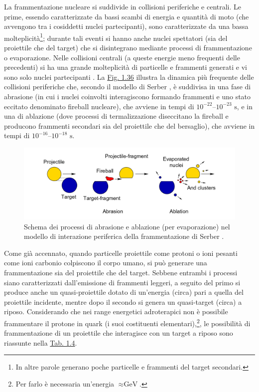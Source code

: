 \documentclass[12pt,a4paper,twoside]{report}
\begin{document}
	La frammentazione nucleare si suddivide in collisioni periferiche e centrali. Le prime, essendo caratterizzate da bassi scambi di energia e quantità di moto (che avvengono tra i cosiddetti nuclei partecipanti), sono caratterizzate da una bassa molteplicità\footnote{In altre parole generano poche particelle e frammenti del target secondari.}; durante tali eventi si hanno anche nuclei spettatori (sia del proiettile che del target) che si disintegrano mediante processi di frammentazione o evaporazione. Nelle collisioni centrali (a queste energie meno frequenti delle precedenti) si ha una grande molteplicità di particelle e frammenti generati e vi sono solo nuclei partecipanti \cite{lnf_document}. La \hyperref[fig:fragmentation]{Fig. 1.36} illustra la dinamica più frequente delle collisioni periferiche che, secondo il modello di Serber \cite{PhysRev.72.1114}, è suddivisa in una fase di abrasione (in cui i nuclei coinvolti interagiscono formando frammenti e uno stato eccitato denominato fireball nucleare), che avviene in tempi di $10^{-22}$--$10^{-23}\mbox{ s}$, e in una di ablazione (dove processi di termalizzazione diseccitano la fireball e producono frammenti secondari sia del proiettile che del bersaglio), che avviene in tempi di $10^{-16}$--$10^{-18}\mbox{ s}$.
	\begin{figure}[H]
		\centering
		\includegraphics[width=0.9\linewidth]{fragmentation.png}
		\caption{Schema dei processi di abrasione e ablazione (per evaporazione) nel modello di interazione periferica della frammentazione di Serber \cite{Schardt2010-bc}.}
		\label{fig:fragmentation}
	\end{figure}
	Come già accennato, quando particelle proiettile come protoni o ioni pesanti come ioni carbonio colpiscono il corpo umano, si può generare una frammentazione sia del proiettile che del target. Sebbene entrambi i processi siano caratterizzati dall'emissione di frammenti leggeri, a seguito del primo si produce anche un quasi-proiettile dotato di un'energia (circa) pari a quella del proiettile incidente, mentre dopo il secondo si genera un quasi-target (circa) a riposo. Considerando che nei range energetici adroterapici non è possibile frammentare il protone in quark (i suoi costituenti elementari),\footnote{Per farlo è necessaria un'energia $\approx\mbox{GeV}$.}, le possibilità di frammentazione di un proiettile che interagisce con un target a riposo sono riassunte nella \hyperref[tab:fragmentation]{Tab. 1.4}.
\end{document}
